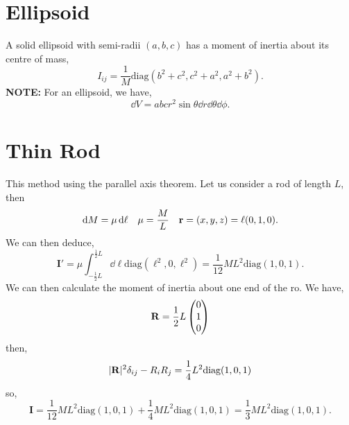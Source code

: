 \documentclass{book}
\begin{document}
\section{Ellipsoid}
A solid ellipsoid with semi-radii $(a,b,c)$ has a moment of inertia about its centre of mass,
\begin{equation}
    I_{ij} = \frac{1}{M}\text{diag}\left(b^2+c^2, c^2+a^2, a^2+b^2\right).
\end{equation}
\textbf{NOTE:} For an ellipsoid, we have,
\begin{equation}
	\dd{V} = abcr^2\sin\theta\dd{r}\dd{\theta}\dd{\phi}.
\end{equation}
\section{Thin Rod}
This method using the parallel axis theorem. Let us consider a rod of length $L$, then
\begin{align}
    \dd{M} = \mu\dd{\ell} && \mu = \frac{M}{L} && \vb{r} = (x,y,z) = \ell(0,1,0).
\end{align}
We can then deduce,
\begin{equation}
    \mathbf{I}' = \mu\int_{-\frac{1}{2}L}^{\frac{1}{2}L}\dd{\ell}\text{diag}(\ell^2,0,\ell^2) = \frac{1}{12}ML^2\text{diag}(1,0,1).
\end{equation}
We can then calculate the moment of inertia about one end of the ro. We have,
\begin{equation}
    \vb{R} = \frac{1}{2}L\begin{pmatrix}
        0 \\ 1 \\ 0
    \end{pmatrix}
\end{equation}
then,
\begin{equation}
    |\vb{R}|^2\delta_{ij} - R_iR_j = \frac{1}{4}L^2\text{diag}(1,0,1)
\end{equation}
so,
\begin{equation}
    \mathbf{I} = \frac{1}{12}ML^2\text{diag}(1,0,1) + \frac{1}{4}ML^2\text{diag}(1,0,1) = \frac{1}{3}ML^2\text{diag}(1,0,1).
\end{equation}
\end{document}
